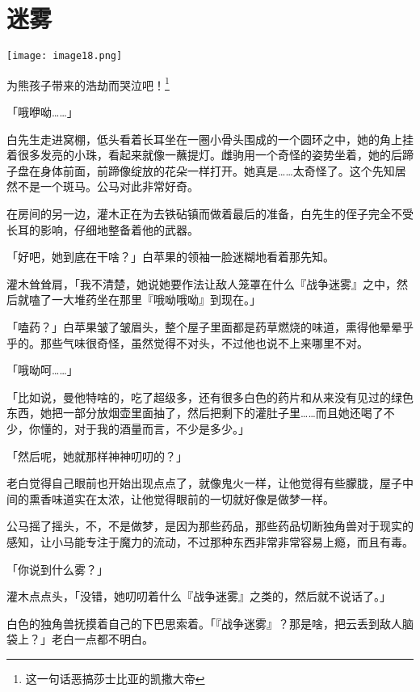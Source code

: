 \chapter{迷雾}

\texttt{[image: image18.png]}

\begin{intro}
    为熊孩子带来的浩劫而哭泣吧！\footnotespacefix\footnote{这一句话恶搞莎士比亚的凯撒大帝}
\end{intro}


「哦咿呦……」

白先生走进窝棚，低头看着长耳坐在一圈小骨头围成的一个圆环之中，她的角上挂着很多发亮的小珠，看起来就像一蘸提灯。雌驹用一个奇怪的姿势坐着，她的后蹄子盘在身体前面，前蹄像绽放的花朵一样打开。她真是……太奇怪了。这个先知居然不是一个斑马。公马对此非常好奇。

在房间的另一边，灌木正在为去铁砧镇而做着最后的准备，白先生的侄子完全不受长耳的影响，仔细地整备着他的武器。

「好吧，她到底在干啥？」白苹果的领袖一脸迷糊地看着那先知。

灌木耸耸肩，「我不清楚，她说她要作法让敌人笼罩在什么『战争迷雾』之中，然后就嗑了一大堆药坐在那里『哦呦哦呦』到现在。」

「嗑药？」白苹果皱了皱眉头，整个屋子里面都是药草燃烧的味道，熏得他晕晕乎乎的。那些气味很奇怪，虽然觉得不对头，不过他也说不上来哪里不对。

「哦呦呵……」

「比如说，曼他特啥的，吃了超级多，还有很多白色的药片和从来没有见过的绿色东西，她把一部分放烟壶里面抽了，然后把剩下的灌肚子里……而且她还喝了不少，你懂的，对于我的酒量而言，不少是多少。」

「然后呢，她就那样神神叨叨的？」

老白觉得自己眼前也开始出现点点了，就像鬼火一样，让他觉得有些朦胧，屋子中间的熏香味道实在太浓，让他觉得眼前的一切就好像是做梦一样。

公马摇了摇头，不，不是做梦，是因为那些药品，那些药品切断独角兽对于现实的感知，让小马能专注于魔力的流动，不过那种东西非常非常容易上瘾，而且有毒。

「你说到什么雾？」

灌木点点头，「没错，她叨叨着什么『战争迷雾』之类的，然后就不说话了。」

白色的独角兽抚摸着自己的下巴思索着。「『战争迷雾』？那是啥，把云丢到敌人脑袋上？」老白一点都不明白。

